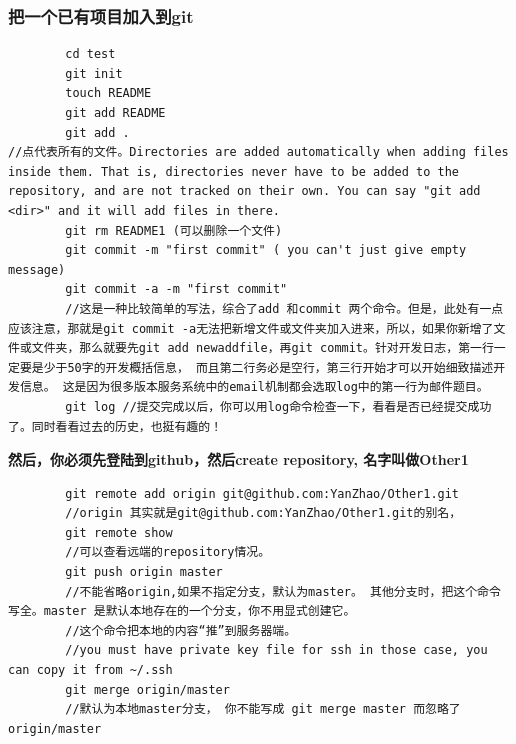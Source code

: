 \documentclass[a4paper,12pt,twoside]{book}
\begin{document}
\begin{CJK*}{UTF8}{song}
\subsubsection{把一个已有项目加入到git}
        \begin{verbatim}
		cd test
		git init
		touch README
		git add README
		git add .
//点代表所有的文件。Directories are added automatically when adding files inside them. That is, directories never have to be added to the repository, and are not tracked on their own. You can say "git add <dir>" and it will add files in there.
		git rm README1 (可以删除一个文件)
		git commit -m "first commit" ( you can't just give empty message)
		git commit -a -m "first commit"
		//这是一种比较简单的写法，综合了add 和commit 两个命令。但是，此处有一点应该注意，那就是git commit -a无法把新增文件或文件夹加入进来，所以，如果你新增了文件或文件夹，那么就要先git add newaddfile，再git commit。针对开发日志，第一行一定要是少于50字的开发概括信息， 而且第二行务必是空行，第三行开始才可以开始细致描述开发信息。 这是因为很多版本服务系统中的email机制都会选取log中的第一行为邮件题目。
		git log //提交完成以后，你可以用log命令检查一下，看看是否已经提交成功了。同时看看过去的历史，也挺有趣的！
        \end{verbatim}
        \textbf{然后，你必须先登陆到github，然后create repository, 名字叫做Other1}
        \begin{verbatim}
		git remote add origin git@github.com:YanZhao/Other1.git
		//origin 其实就是git@github.com:YanZhao/Other1.git的别名，
		git remote show
		//可以查看远端的repository情况。
		git push origin master 	
        //不能省略origin,如果不指定分支，默认为master。 其他分支时，把这个命令写全。master 是默认本地存在的一个分支，你不用显式创建它。
		//这个命令把本地的内容“推”到服务器端。
		//you must have private key file for ssh in those case, you can copy it from ~/.ssh
        git merge origin/master
        //默认为本地master分支， 你不能写成 git merge master 而忽略了origin/master 
		\end{verbatim}


\end{CJK*}
\end{document}

